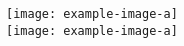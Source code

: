 \documentclass{article}
\begin{document}
\begin{center}
    \texttt{[image: example-image-a]}\\
    \texttt{[image: example-image-a]}
\end{center}
\lipsum[1-20]
\end{document}
